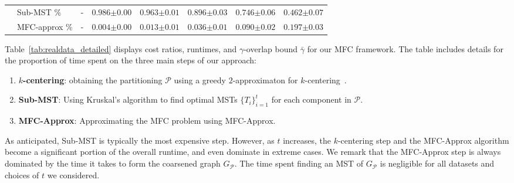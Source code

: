 \begin{table}[t!]
{\begin{tabular}{ llllllll }
			& Sub-MST \% & - & $ 0.986  \scriptstyle{ \pm  0.00  } $ & $ 0.963  \scriptstyle{ \pm  0.01  } $ & $ 0.896  \scriptstyle{ \pm  0.03  } $ & $ 0.746  \scriptstyle{ \pm  0.06  } $ & $ 0.462  \scriptstyle{ \pm  0.07  } $ \\
			& MFC-approx \% & - & $ 0.004  \scriptstyle{ \pm  0.00  } $ & $ 0.013  \scriptstyle{ \pm  0.01  } $ & $ 0.036  \scriptstyle{ \pm  0.01  } $ & $ 0.090  \scriptstyle{ \pm  0.02  } $ & $ 0.197  \scriptstyle{ \pm  0.03  } $ \\
			\bottomrule
		\end{tabular}
	}
\end{table}

Table~\ref{tab:realdata_detailed} displays cost ratios, runtimes, and $\gamma$-overlap bound $\bar{\gamma}$ for our MFC framework. The table includes details for the proportion of time spent on the three main steps of our approach: 
\begin{enumerate}[itemsep=0pt,leftmargin=10pt,label = {}]
	\item \textbf{$k$-centering}: obtaining the partitioning $\mathcal{P}$ using a greedy $2$-approximaton for $k$-centering~\cite{gonzalez1985clustering}.
	\item \textbf{Sub-MST}: Using Kruskal's algorithm to find optimal MSTs $\{T_i\}_{i=1}^t$ for each component in $\mathcal{P}$.
	\item \textbf{MFC-Approx}: Approximating the MFC problem using \textsf{MFC-Approx}.
\end{enumerate}
As anticipated, Sub-MST is typically the most expensive step. However, as $t$ increases, the $k$-centering step and the \textsf{MFC-Approx} algorithm become a significant portion of the overall runtime, and even dominate in extreme cases. We remark that the \textsf{MFC-Approx} step is always dominated by the time it takes to form the coarsened graph $G_\mathcal{P}$. The time spent finding an MST of $G_\mathcal{P}$ is negligible for all datasets and choices of $t$ we considered. 

